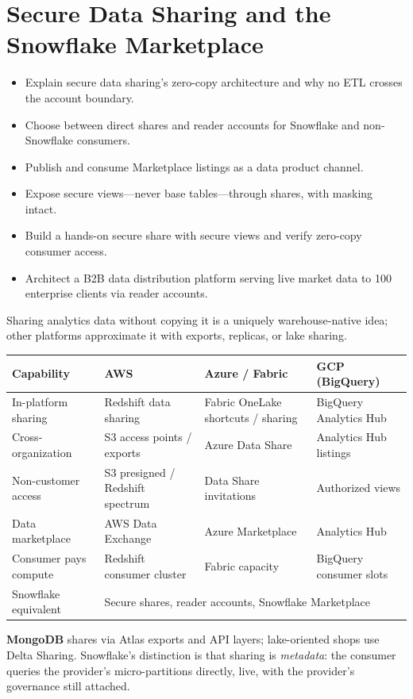 \chapter{Secure Data Sharing and the Snowflake Marketplace}
%
\begin{objectives}
\begin{itemize}
    \item Explain secure data sharing's zero-copy architecture and why no ETL crosses the account boundary.
    \item Choose between direct shares and reader accounts for Snowflake and non-Snowflake consumers.
    \item Publish and consume Marketplace listings as a data product channel.
    \item Expose secure views---never base tables---through shares, with masking intact.
    \item Build a hands-on secure share with secure views and verify zero-copy consumer access.
    \item Architect a B2B data distribution platform serving live market data to 100 enterprise clients via reader accounts.
\end{itemize}
\end{objectives}

\begin{crosscloud}
Sharing analytics data without copying it is a uniquely warehouse-native idea; other platforms approximate it with exports, replicas, or lake sharing.

\vspace{2mm}
{\footnotesize
\begin{tabular}{@{}p{2.8cm}p{3.0cm}p{3.0cm}p{3.0cm}@{}}
\toprule
\textbf{Capability} & \textbf{AWS} & \textbf{Azure / Fabric} & \textbf{GCP (BigQuery)} \\
\midrule
In-platform sharing & Redshift data sharing & Fabric OneLake shortcuts / sharing & BigQuery Analytics Hub \\
Cross-organization & S3 access points / exports & Azure Data Share & Analytics Hub listings \\
Non-customer access & S3 presigned / Redshift spectrum & Data Share invitations & Authorized views \\
Data marketplace & AWS Data Exchange & Azure Marketplace & Analytics Hub \\
Consumer pays compute & Redshift consumer cluster & Fabric capacity & BigQuery consumer slots \\
\addlinespace
Snowflake equivalent & \multicolumn{3}{l}{Secure shares, reader accounts, Snowflake Marketplace} \\
\bottomrule
\end{tabular}}

\vspace{1mm}
\textbf{MongoDB} shares via Atlas exports and API layers; lake-oriented shops use Delta Sharing. Snowflake's distinction is that sharing is \emph{metadata}: the consumer queries the provider's micro-partitions directly, live, with the provider's governance still attached.
\end{crosscloud}


